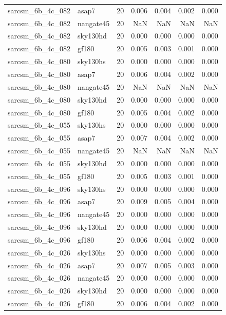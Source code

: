 \begin{tabular}{llrrrrr}
sarcsm\_6b\_4c\_082 & asap7 & 20 & 0.006 & 0.004 & 0.002 & 0.000 \\
sarcsm\_6b\_4c\_082 & nangate45 & 20 & NaN & NaN & NaN & NaN \\
sarcsm\_6b\_4c\_082 & sky130hd & 20 & 0.000 & 0.000 & 0.000 & 0.000 \\
sarcsm\_6b\_4c\_082 & gf180 & 20 & 0.005 & 0.003 & 0.001 & 0.000 \\
sarcsm\_6b\_4c\_080 & sky130hs & 20 & 0.000 & 0.000 & 0.000 & 0.000 \\
sarcsm\_6b\_4c\_080 & asap7 & 20 & 0.006 & 0.004 & 0.002 & 0.000 \\
sarcsm\_6b\_4c\_080 & nangate45 & 20 & NaN & NaN & NaN & NaN \\
sarcsm\_6b\_4c\_080 & sky130hd & 20 & 0.000 & 0.000 & 0.000 & 0.000 \\
sarcsm\_6b\_4c\_080 & gf180 & 20 & 0.005 & 0.004 & 0.002 & 0.000 \\
sarcsm\_6b\_4c\_055 & sky130hs & 20 & 0.000 & 0.000 & 0.000 & 0.000 \\
sarcsm\_6b\_4c\_055 & asap7 & 20 & 0.007 & 0.004 & 0.002 & 0.000 \\
sarcsm\_6b\_4c\_055 & nangate45 & 20 & NaN & NaN & NaN & NaN \\
sarcsm\_6b\_4c\_055 & sky130hd & 20 & 0.000 & 0.000 & 0.000 & 0.000 \\
sarcsm\_6b\_4c\_055 & gf180 & 20 & 0.005 & 0.003 & 0.001 & 0.000 \\
sarcsm\_6b\_4c\_096 & sky130hs & 20 & 0.000 & 0.000 & 0.000 & 0.000 \\
sarcsm\_6b\_4c\_096 & asap7 & 20 & 0.009 & 0.005 & 0.004 & 0.000 \\
sarcsm\_6b\_4c\_096 & nangate45 & 20 & 0.000 & 0.000 & 0.000 & 0.000 \\
sarcsm\_6b\_4c\_096 & sky130hd & 20 & 0.000 & 0.000 & 0.000 & 0.000 \\
sarcsm\_6b\_4c\_096 & gf180 & 20 & 0.006 & 0.004 & 0.002 & 0.000 \\
sarcsm\_6b\_4c\_026 & sky130hs & 20 & 0.000 & 0.000 & 0.000 & 0.000 \\
sarcsm\_6b\_4c\_026 & asap7 & 20 & 0.007 & 0.005 & 0.003 & 0.000 \\
sarcsm\_6b\_4c\_026 & nangate45 & 20 & 0.000 & 0.000 & 0.000 & 0.000 \\
sarcsm\_6b\_4c\_026 & sky130hd & 20 & 0.000 & 0.000 & 0.000 & 0.000 \\
sarcsm\_6b\_4c\_026 & gf180 & 20 & 0.006 & 0.004 & 0.002 & 0.000 \\

\end{tabular}
